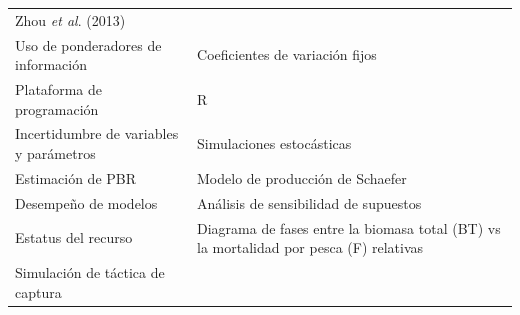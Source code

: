 \documentclass[
  spanish,
]{article}
\begin{document}
\begin{longtable}[]{@{}ll@{}}
\begin{minipage}[t]{0.64\columnwidth}
Zhou \emph{et al}. (2013)\strut
\end{minipage}\tabularnewline
\begin{minipage}[t]{0.30\columnwidth}\raggedright
Uso de ponderadores de información\strut
\end{minipage} & \begin{minipage}[t]{0.64\columnwidth}\raggedright
Coeficientes de variación fijos\strut
\end{minipage}\tabularnewline
\begin{minipage}[t]{0.30\columnwidth}\raggedright
Plataforma de programación\strut
\end{minipage} & \begin{minipage}[t]{0.64\columnwidth}\raggedright
R\strut
\end{minipage}\tabularnewline
\begin{minipage}[t]{0.30\columnwidth}\raggedright
Incertidumbre de variables y parámetros\strut
\end{minipage} & \begin{minipage}[t]{0.64\columnwidth}\raggedright
Simulaciones estocásticas\strut
\end{minipage}\tabularnewline
\begin{minipage}[t]{0.30\columnwidth}\raggedright
Estimación de PBR\strut
\end{minipage} & \begin{minipage}[t]{0.64\columnwidth}\raggedright
Modelo de producción de Schaefer\strut
\end{minipage}\tabularnewline
\begin{minipage}[t]{0.30\columnwidth}\raggedright
Desempeño de modelos\strut
\end{minipage} & \begin{minipage}[t]{0.64\columnwidth}\raggedright
Análisis de sensibilidad de supuestos\strut
\end{minipage}\tabularnewline
\begin{minipage}[t]{0.30\columnwidth}\raggedright
Estatus del recurso\strut
\end{minipage} & \begin{minipage}[t]{0.64\columnwidth}\raggedright
Diagrama de fases entre la biomasa total (BT) vs la mortalidad por pesca
(F) relativas\strut
\end{minipage}\tabularnewline
\begin{minipage}[t]{0.30\columnwidth}\raggedright
Simulación de táctica de captura\strut
\end{minipage} & \begin{minipage}[t]{0.64\columnwidth}\raggedright

\end{minipage}
\end{longtable}
\end{document}
